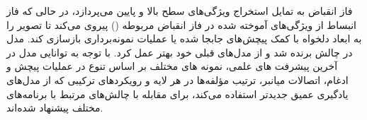 فاز انقباض به تمایل استخراج ویژگی‌های سطح بالا و پایین می‌پردازد، در حالی که فاز انبساط از ویژگی‌های آموخته شده در فاز انقباض مربوطه () پیروی می‌کند تا تصویر را به ابعاد دلخواه با کمک پیچش‌های جابجا شده یا عملیات نمونه‌برداری بازسازی کند. مدل  در چالش  برنده شد و از مدل‌های قبلی خود بهتر عمل کرد.
با توجه به توانایی مدل  در آخرین پیشرفت های علمی، نمونه های مختلف بر اساس تنوع در عملیات پیچش و ادغام، اتصالات میانبر، ترتیب مؤلفه‌ها در هر لایه و رویکردهای ترکیبی که از مدل‌های یادگیری عمیق جدیدتر استفاده می‌کند، برای مقابله با چالش‌های مرتبط با برنامه‌های مختلف پیشنهاد شده‌اند\cite{punn2022modality}.
\\

